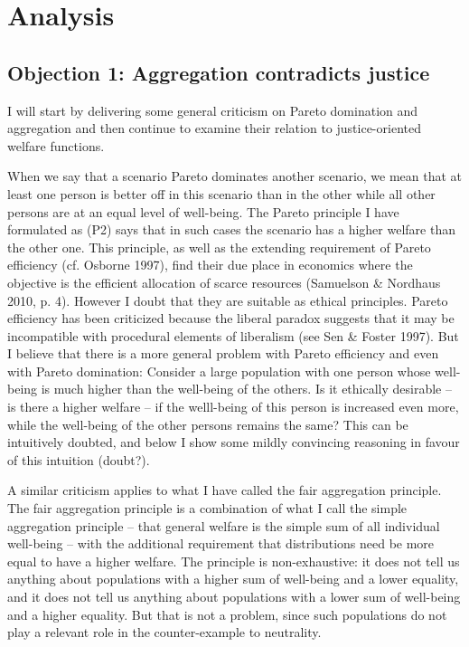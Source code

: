 \chapter{Analysis}
\section{Objection 1: Aggregation contradicts justice}

I will start by delivering some general criticism on Pareto domination and aggregation and then continue to examine their relation to justice-oriented welfare functions.  

When we say that a scenario Pareto dominates another scenario, we mean that at least one person is better off in this scenario than in the other while all other persons are at an equal level of well-being. The Pareto principle I have formulated as (P2) says that in such cases the scenario has a higher welfare than the other one. This principle, as well as the extending requirement of Pareto efficiency (cf. \label{ref:RND8Hv7yXwRou}Osborne 1997), find their due place in economics where the objective is the efficient allocation of scarce resources (\label{ref:RNDutDkBfheMg}Samuelson \& Nordhaus 2010, p. 4). However I doubt that they are suitable as ethical principles. Pareto efficiency has been criticized because the liberal paradox suggests that it may be incompatible with procedural elements of liberalism (see \label{ref:RNDiYsz4NL9rY}Sen \& Foster 1997). But I believe that there is a more general problem with Pareto efficiency and even with Pareto domination: Consider a large population with one person whose well-being is much higher than the well-being of the others. Is it ethically desirable – is there a higher welfare – if the welll-being of this person is increased even more, while the well-being of the other persons remains the same? This can be intuitively doubted, and below I show some mildly convincing reasoning in favour of this intuition (doubt?).  

A similar criticism applies to what I have called the fair aggregation principle. The fair aggregation principle is a combination of what I call the simple aggregation principle – that general welfare is the simple sum of all individual well-being – with the additional requirement that distributions need be more equal to have a higher welfare. The principle is non-exhaustive: it does not tell us anything about populations with a higher sum of well-being and a lower equality, and it does not tell us anything about populations with a lower sum of well-being and a higher equality. But that is not a problem, since such populations do not play a relevant role in the counter-example to neutrality.  

